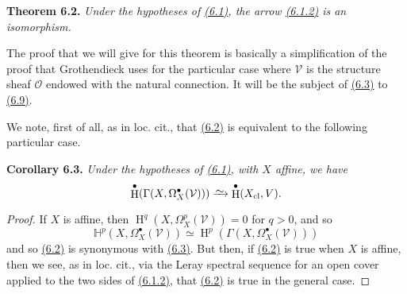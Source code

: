 \documentclass{report}
\newenvironment{itenv}[1]
  {\phantomsection\par\medskip\noindent\textbf{#1.}\itshape}
  {\par\medskip}
\renewcommand{\cal}[1]{{\mathcal{#1}}}
\newcommand{\cl}{\mathrm{cl}}
\newcommand{\simto}{\xrightarrow{\raisebox{-0.7ex}[0ex][0ex]{$\sim$}}}
\DeclareMathOperator{\HH}{H}
\newcommand{\oldpage}[1]{\marginpar{\footnotesize$\Big\vert$ \textit{p.~#1}}}
\begin{document}
\begin{itenv}{Theorem 6.2}
\label{II.6.2}
  Under the hypotheses of \hyperref[II.6.1]{(6.1)}, the arrow \hyperref[II.6.1.2]{(6.1.2)} is an isomorphism.
\end{itenv}

\oldpage{99}

The proof that we will give for this theorem is basically a simplification of the proof that Grothendieck \cite{9} uses for the particular case where $\cal{V}$ is the structure sheaf $\cal{O}$ endowed with the natural connection.
It will be the subject of \hyperref[II.6.3]{(6.3)} to \hyperref[II.6.9]{(6.9)}.

We note, first of all, as in loc. cit., that \hyperref[II.6.2]{(6.2)} is equivalent to the following particular case.

\begin{itenv}{Corollary 6.3}
\label{II.6.3}
  Under the hypotheses of \hyperref[II.6.1]{(6.1)}, with $X$ affine, we have
  \[
    \HH^\bullet(\Gamma(X,\Omega_X^\bullet(\cal{V})))
    \simto \HH^\bullet(X_\cl,V).
  \]
\end{itenv}

\begin{proof}
  If $X$ is affine, then $\HH^q(X,\Omega_X^p(\cal{V}))=0$ for $q>0$, and so
  \[
    \mathbb{H}^p(X,\Omega_X^\bullet(\cal{V}))
    \simeq \HH^p(\Gamma(X,\Omega_X^\bullet(\cal{V})))
  \]
  and so \hyperref[II.6.2]{(6.2)} is synonymous with \hyperref[II.6.3]{(6.3)}.
  But then, if \hyperref[II.6.2]{(6.2)} is true when $X$ is affine, then we see, as in loc. cit., via the Leray spectral sequence for an open cover applied to the two sides of \hyperref[II.6.1.2]{(6.1.2)}, that \hyperref[II.6.2]{(6.2)} is true in the general case.
\end{proof}
\end{document}
